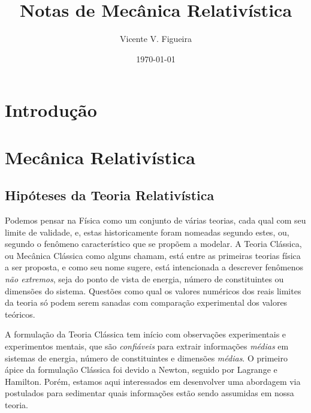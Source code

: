 \documentclass[twoside]{amsart}
\title{
Notas de Mecânica Relativística
}
\author{
  Vicente V. Figueira
       }
\date{\today}
\numberwithin{equation}{section}
\begin{document}
\maketitle

\tableofcontents


\section{Introdução}



\section{Mecânica Relativística}

\subsection{Hipóteses da Teoria Relativística}


Podemos pensar na Física como um conjunto de várias teorias, cada qual com seu limite de 
validade, e, estas historicamente foram nomeadas segundo estes, ou, segundo o fenômeno 
característico que se propõem a modelar. A Teoria Clássica, ou Mecânica Clássica como 
alguns chamam, está entre as primeiras teorias física a ser proposta, e como seu nome 
sugere, está intencionada a descrever fenômenos \emph{não extremos}, seja do ponto de 
vista de energia, número de constituintes ou dimensões do sistema. Questões como qual 
os valores numéricos dos reais limites da teoria só podem serem sanadas com comparação 
experimental dos valores teóricos.

A formulação da Teoria Clássica tem início com observações experimentais e experimentos 
mentais, que são \emph{confiáveis} para extrair informações \emph{médias} em sistemas de 
energia, número de constituintes e dimensões \emph{médias}. O primeiro ápice da formulação 
Clássica foi devido a Newton, seguido por Lagrange e Hamilton. Porém, estamos aqui interessados 
em desenvolver uma abordagem via postulados para sedimentar quais informações estão sendo 
assumidas em nossa teoria.
\end{document}
